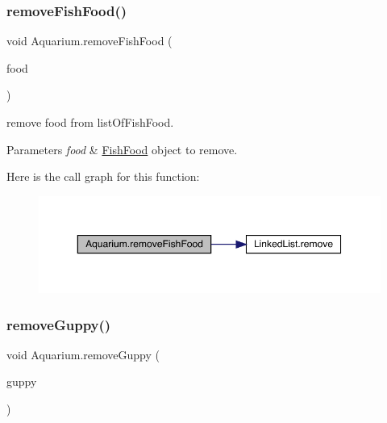 \subsubsection{\texorpdfstring{remove\+Fish\+Food()}{removeFishFood()}}
{\footnotesize\ttfamily void Aquarium.\+remove\+Fish\+Food (\begin{DoxyParamCaption}\item[{\mbox{\hyperlink{class_fish_food}{Fish\+Food}}}]{food }\end{DoxyParamCaption})\hspace{0.3cm}{\ttfamily [inline]}}

remove food from list\+Of\+Fish\+Food. 
\begin{DoxyParams}{Parameters}
{\em food} & \mbox{\hyperlink{class_fish_food}{Fish\+Food}} object to remove. \\
\hline
\end{DoxyParams}
Here is the call graph for this function\+:
\nopagebreak
\begin{figure}[H]
\begin{center}
\leavevmode
\includegraphics[width=350pt]{class_aquarium_a6c1a0d6a0cc7cd4604dfce22706f57ca_cgraph}
\end{center}
\end{figure}
\mbox{\label{class_aquarium_a08f7e597644cad58198ed84d431f4599}} 
\subsubsection{\texorpdfstring{remove\+Guppy()}{removeGuppy()}}
{\footnotesize\ttfamily void Aquarium.\+remove\+Guppy (\begin{DoxyParamCaption}\item[{\mbox{\hyperlink{class_guppy}{Guppy}}}]{guppy }\end{DoxyParamCaption})\hspace{0.3cm}{\ttfamily [inline]}}

